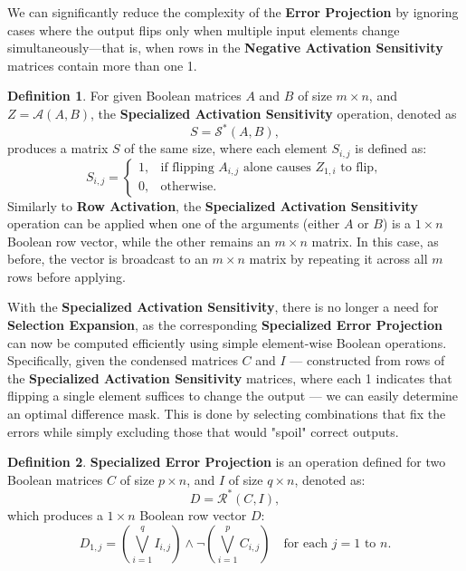 \documentclass{article}
\theoremstyle{definition}
\newtheorem*{definition}{Definition}
\theoremstyle{remark}
\begin{document}
We can significantly reduce the complexity of the \textbf{Error Projection} by ignoring cases where the output flips only when multiple input elements change simultaneously—that is, when rows in the \textbf{Negative Activation Sensitivity} matrices contain more than one 1.

\begin{definition}
    For given Boolean matrices \( A \) and \( B \) of size \( m \times n \), and \( Z = \mathcal{A}(A, B) \), the \textbf{Specialized Activation Sensitivity} operation, denoted as
    \[ S = \mathcal{S}^*(A, B), \]
    produces a matrix \( S \) of the same size, where each element \( S_{i,j} \) is defined as:
    \[ S_{i,j} =
        \begin{cases}
            1, & \text{if flipping } A_{i,j} \text{ alone causes } Z_{1,i} \text{ to flip}, \\
            0, & \text{otherwise}.
        \end{cases}
    \]
    Similarly to \textbf{Row Activation}, the \textbf{Specialized Activation Sensitivity} operation can be applied when one of the arguments (either \( A \) or \( B \)) is a \( 1 \times n \) Boolean row vector, while the other remains an \( m \times n \) matrix. In this case, as before, the vector is broadcast to an \( m \times n \) matrix by repeating it across all \( m \) rows before applying.
\end{definition}

With the \textbf{Specialized Activation Sensitivity}, there is no longer a need for \textbf{Selection Expansion}, as the corresponding \textbf{Specialized Error Projection} can now be computed efficiently using simple element-wise Boolean operations. Specifically, given the condensed matrices \( C \) and \( I \) — constructed from rows of the \textbf{Specialized Activation Sensitivity} matrices, where each 1 indicates that flipping a single element suffices to change the output — we can easily determine an optimal difference mask. This is done by selecting combinations that fix the errors while simply excluding those that would "spoil" correct outputs.

\begin{definition}
    \textbf{Specialized Error Projection} is an operation defined for two Boolean matrices \( C \) of size \( p \times n \), and \( I \) of size \( q \times n \), denoted as:
    \[ D = \mathcal{R}^*(C, I), \]
    which produces a \( 1 \times n \) Boolean row vector \( D \):
    \[ D_{1,j} = \left( \bigvee_{i=1}^{q} I_{i,j} \right) \wedge \neg \left( \bigvee_{i=1}^{p} C_{i,j} \right) \quad \text{for each } j = 1 \text{ to } n.
    \]
\end{definition}
\end{document}

